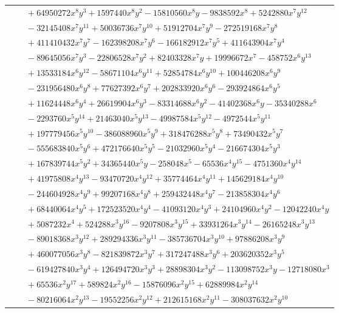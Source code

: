 \documentclass[11pt]{article}
\begin{document}
\begin{longtable}{@{}ll@{}}
 & $\quad +64950272x^{8}y^{3}+1597440x^{8}y^{2}-15810560x^{8}y-9838592x^{8}+5242880x^{7}y^{12}$\\
 & $\quad -32145408x^{7}y^{11}+50036736x^{7}y^{10}+51912704x^{7}y^{9}-272519168x^{7}y^{8}$\\
 & $\quad +411410432x^{7}y^{7}-162398208x^{7}y^{6}-166182912x^{7}y^{5}+411643904x^{7}y^{4}$\\
 & $\quad -89645056x^{7}y^{3}-22806528x^{7}y^{2}+82403328x^{7}y+19996672x^{7}-458752x^{6}y^{13}$\\
 & $\quad +13533184x^{6}y^{12}-58671104x^{6}y^{11}+52854784x^{6}y^{10}+100446208x^{6}y^{9}$\\
 & $\quad -231956480x^{6}y^{8}+77627392x^{6}y^{7}+202833920x^{6}y^{6}-293924864x^{6}y^{5}$\\
 & $\quad +11624448x^{6}y^{4}+26619904x^{6}y^{3}-83314688x^{6}y^{2}-41402368x^{6}y-35340288x^{6}$\\
 & $\quad -2293760x^{5}y^{14}+21463040x^{5}y^{13}-49987584x^{5}y^{12}-4972544x^{5}y^{11}$\\
 & $\quad +197779456x^{5}y^{10}-386088960x^{5}y^{9}+318476288x^{5}y^{8}+73490432x^{5}y^{7}$\\
 & $\quad -555683840x^{5}y^{6}+472176640x^{5}y^{5}-21032960x^{5}y^{4}-216674304x^{5}y^{3}$\\
 & $\quad +167839744x^{5}y^{2}+34365440x^{5}y-258048x^{5}-65536x^{4}y^{15}-4751360x^{4}y^{14}$\\
 & $\quad +41975808x^{4}y^{13}-93470720x^{4}y^{12}+35774464x^{4}y^{11}+145629184x^{4}y^{10}$\\
 & $\quad -244604928x^{4}y^{9}+99207168x^{4}y^{8}+259432448x^{4}y^{7}-213858304x^{4}y^{6}$\\
 & $\quad +68440064x^{4}y^{5}+172523520x^{4}y^{4}-41093120x^{4}y^{3}+24104960x^{4}y^{2}-12042240x^{4}y$\\
 & $\quad +5087232x^{4}+524288x^{3}y^{16}-9207808x^{3}y^{15}+33931264x^{3}y^{14}-26165248x^{3}y^{13}$\\
 & $\quad -89018368x^{3}y^{12}+289294336x^{3}y^{11}-385736704x^{3}y^{10}+97886208x^{3}y^{9}$\\
 & $\quad +460077056x^{3}y^{8}-821839872x^{3}y^{7}+317247488x^{3}y^{6}+203620352x^{3}y^{5}$\\
 & $\quad -619427840x^{3}y^{4}+126494720x^{3}y^{3}+28898304x^{3}y^{2}-113098752x^{3}y-12718080x^{3}$\\
 & $\quad +65536x^{2}y^{17}+589824x^{2}y^{16}-15876096x^{2}y^{15}+62889984x^{2}y^{14}$\\
 & $\quad -80216064x^{2}y^{13}-19552256x^{2}y^{12}+212615168x^{2}y^{11}-308037632x^{2}y^{10}$\\

\end{longtable}
\end{document}
